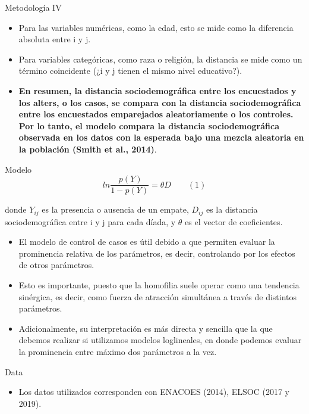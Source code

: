 \documentclass[
  8pt,
  ignorenonframetext,
]{beamer}
\providecommand{\tightlist}{%
  \setlength{\itemsep}{0pt}\setlength{\parskip}{0pt}}
\begin{document}
\begin{frame}{Metodología IV}
\protect\hypertarget{metodologuxeda-iv}{}
\begin{itemize}
\item
  Para las variables numéricas, como la edad, esto se mide como la
  diferencia absoluta entre i y j.
\item
  Para variables categóricas, como raza o religión, la distancia se mide
  como un término coincidente (¿i y j tienen el mismo nivel educativo?).
\item
  \textbf{En resumen, la distancia sociodemográfica entre los
  encuestados y los alters, o los casos, se compara con la distancia
  sociodemográfica entre los encuestados emparejados aleatoriamente o
  los controles. Por lo tanto, el modelo compara la distancia
  sociodemográfica observada en los datos con la esperada bajo una
  mezcla aleatoria en la población (Smith et al., 2014)}.
\end{itemize}
\end{frame}

\begin{frame}{Modelo}
\protect\hypertarget{modelo}{}
\[
ln\frac{\ p(Y)}{1- p(Y)} = \theta D \qquad (1)
\]

donde \(Y_{ij}\) es la presencia o ausencia de un empate, \(D_{ij}\) es
la distancia sociodemográfica entre i y j para cada díada, y \(\theta\)
es el vector de coeficientes.

\begin{itemize}
\item
  El modelo de control de casos es útil debido a que permiten evaluar la
  prominencia relativa de los parámetros, es decir, controlando por los
  efectos de otros parámetros.
\item
  Esto es importante, puesto que la homofilia suele operar como una
  tendencia sinérgica, es decir, como fuerza de atracción simultánea a
  través de distintos parámetros.
\item
  Adicionalmente, su interpretación es más directa y sencilla que la que
  debemos realizar si utilizamos modelos loglineales, en donde podemos
  evaluar la prominencia entre máximo dos parámetros a la vez.
\end{itemize}
\end{frame}

\begin{frame}{Data}
\protect\hypertarget{data}{}
\begin{itemize}
\tightlist
\item
  Los datos utilizados corresponden con ENACOES (2014), ELSOC (2017 y
  2019).
\end{itemize}
\end{frame}
\end{document}
